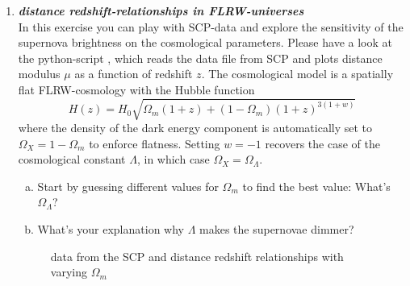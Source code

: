\documentclass[a4paper,12pt]{article}
\newcommand{\question}[1]{\textbf{\textit{#1}}}
\begin{document}
\begin{enumerate}

\item \question{distance redshift-relationships in FLRW-universes}\\
In this exercise you can play with SCP-data and explore the sensitivity of the supernova brightness on the cosmological parameters. Please have a look at the python-script , which reads the data file from SCP and plots distance modulus $\mu$ as a function of redshift $z$. The cosmological model is a spatially flat FLRW-cosmology with the Hubble function
\begin{equation}
H(z) = H_0\sqrt{\Omega_m(1+z) + (1-\Omega_m)(1+z)^{3(1+w)}}
\end{equation}
where the density of the dark energy component is automatically set to $\Omega_X=1-\Omega_m$ to enforce flatness. Setting $w=-1$ recovers the case of the cosmological constant $\Lambda$, in which case $\Omega_X=\Omega_\Lambda$.

\begin{enumerate}[(a)]
\item{Start by guessing different values for $\Omega_m$ to find the best value: What's $\Omega_\Lambda$?}
\item{What's your explanation why $\Lambda$ makes the supernovae dimmer?}
\end{enumerate}

\begin{figure}[h]
\begin{center}
\caption{data from the SCP and distance redshift relationships with varying $\Omega_m$}
\end{center}
\end{figure}


\end{enumerate}
\end{document}
